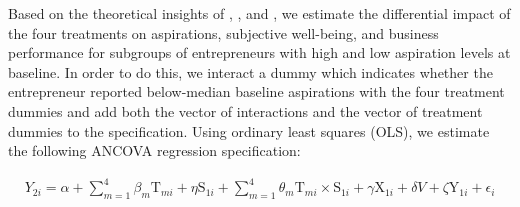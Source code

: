 \documentclass[11.5pt]{article}
\begin{document}


Based on the theoretical insights of \citet{Ray2006}, \citet{Genicot2017}, and \citet{Dalton2016}, we estimate the differential impact of the four treatments on aspirations, subjective well-being, and business performance for subgroups of entrepreneurs with high and low aspiration levels at baseline. In order to do this, we interact a dummy which indicates whether the entrepreneur reported below-median baseline aspirations with the four treatment dummies and add both the vector of interactions and the vector of treatment dummies to the specification. Using ordinary least squares (OLS), we estimate the following ANCOVA regression specification:

\begin{align}
    {Y}_{2i} = \alpha + \sum\limits_{m=1}^4 \beta_m \text{T}_{mi} + \eta \text{S}_{1i} + \sum\limits_{m=1}^4 \theta_m \text{T}_{mi} \times \text{S}_{1i} + \gamma \text{X}_{1i} + \delta {V} + \zeta \text{Y}_{1i} + \epsilon_i \label{eq:2}
\end{align}
\end{document}
